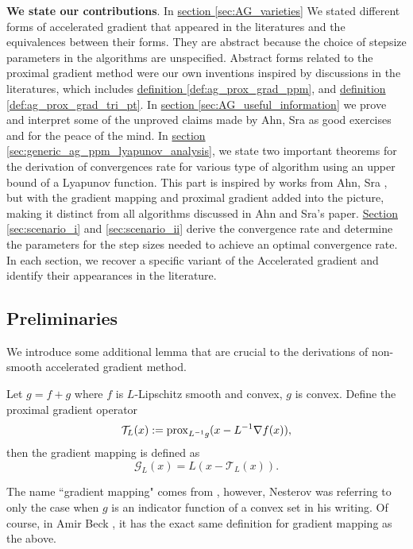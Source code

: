 \documentclass[12pt]{article}
\begin{document}
    \par\noindent
    \textbf{We state our contributions}. 
    In \hyperref[sec:AG_varieties]{section \ref*{sec:AG_varieties}} 
    We stated different forms of accelerated gradient that appeared in the literatures and the equivalences between their forms. 
    They are abstract because the choice of stepsize parameters in the algorithms are unspecified. 
    Abstract forms related to the proximal gradient method were our own inventions inspired by discussions in the literatures, which includes 
    \hyperref[def:ag_prox_grad_ppm]{definition \ref*{def:ag_prox_grad_ppm}}, and 
    \hyperref[def:ag_prox_grad_tri_pt]{definition \ref*{def:ag_prox_grad_tri_pt}}. 
    In \hyperref[sec:AG_useful_information]{section \ref*{sec:AG_useful_information}}
    we prove and interpret some of the unproved claims made by Ahn, Sra \cite{ahn_understanding_2022} as good exercises and for the peace of the mind. 
    In
    \hyperref[sec:generic_ag_ppm_lyapunov_analysis]{section \ref*{sec:generic_ag_ppm_lyapunov_analysis}},
    we state two important theorems for the derivation of convergences rate for various type of algorithm using an upper bound of a Lyapunov function. 
    This part is inspired by works from Ahn, Sra \cite{ahn_understanding_2022}, but with the gradient mapping and proximal gradient added into the picture, making it distinct from all algorithms discussed in Ahn and Sra's paper. 
    \hyperref[sec:scenario_i]{Section \ref*{sec:scenario_i}} and 
    \hyperref[sec:scenario_ii]{\ref*{sec:scenario_ii}} derive the convergence rate and determine the parameters for the step sizes needed to achieve an optimal convergence rate. 
    In each section, we recover a specific variant of the Accelerated gradient and identify their appearances in the literature. 

    
    \subsection{Preliminaries}
        We introduce some additional lemma that are crucial to the derivations of non-smooth accelerated gradient method. 
        \begin{definition}
            \label{def:gradient_mapping}
            Let $g = f + g$ where $f$ is $L$-Lipschitz smooth and convex, $g$ is convex. 
            Define the proximal gradient operator
            $$
                \mathcal T_L(x) := \operatorname{prox}_{L^{-1}g}(x - L^{-1}\nabla f(x)),
            $$
            then the gradient mapping is defined as
            $$
                \mathcal G_L(x) = L(x - \mathcal T_L(x)). 
            $$
        \end{definition}
        \begin{remark}
            The name ``gradient mapping" comes from \cite[(2.2.54)]{nesterov_lectures_2018}, however, Nesterov was referring to only the case when $g$ is an indicator function of a convex set in his writing. 
            Of course, in Amir Beck \cite[10.3.2]{beck_first-order_nodate}, it has the exact same definition for gradient mapping as the above. 
        \end{remark}
\end{document}
